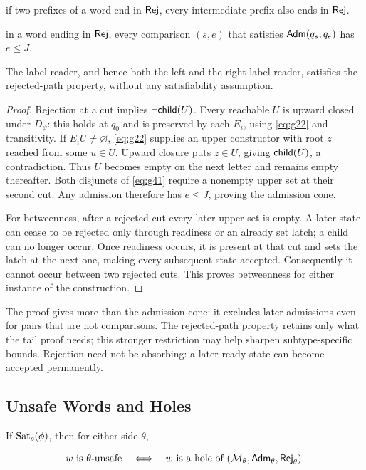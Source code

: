 \begin{description}[style=nextline,leftmargin=1em,font=\normalfont\itshape]\item[Betweenness] if two prefixes of a word end in $\mathsf{Rej}$, every intermediate
  prefix also ends in $\mathsf{Rej}$.
\item[Admission cone] in a word ending in $\mathsf{Rej}$, every comparison
  $(s,e)$ that satisfies $\mathsf{Adm}(q_s,q_e)$ has $e\le J$.

\end{description}

\begin{lemma}\label{lem:between}\label{lem:cone}
The label reader, and hence both the left and the right label reader, satisfies the rejected-path
property, without any satisfiability assumption.
\end{lemma}

\begin{proof} Rejection at a cut implies $\neg\mathsf{child}(U)$.
Every reachable $U$ is upward closed under $D_\psi$: this holds at
$q_0$ and is preserved by each $E_i$, using \eqref{eq:g22} and transitivity.
If $E_iU\ne\varnothing$, \eqref{eq:g22} supplies an upper constructor with root
$z$ reached from some $u\in U$. Upward closure puts $z\in U$,
giving $\mathsf{child}(U)$, a contradiction. Thus $U$ becomes
empty on the next letter and remains empty thereafter. Both disjuncts of \eqref{eq:g41} require a
nonempty upper set at their second cut. Any admission therefore has
$e\le J$, proving the admission cone.

For betweenness, after a rejected cut every later upper set is empty. A later
state can cease to be rejected only through readiness or an already set
latch; a child can no longer occur. Once readiness occurs, it is present
at that cut and sets the latch at the next one, making every subsequent
state accepted. Consequently it cannot occur between two rejected cuts.
This proves betweenness for either instance of the construction. \end{proof}

The proof gives more than the admission cone: it excludes later
admissions even for pairs that are not comparisons. The rejected-path property retains
only what the tail proof needs; this stronger restriction may help sharpen
subtype-specific bounds. Rejection need not be absorbing: a later ready
state can become accepted permanently.

\subsection{Unsafe Words and Holes}\label{sec:side-bridge}
\begin{theorem}\label{thm:holes}
If $\operatorname{Sat}_c(\phi)$, then for either side $\theta$,

\begin{equation}\label{eq:g44}
w\text{ is }\theta\text{-unsafe}
 \quad\Longleftrightarrow\quad
 w\text{ is a hole of }(\mathcal{M}_\theta,\mathsf{Adm}_\theta,\mathsf{Rej}_\theta).
\end{equation}\end{theorem}

